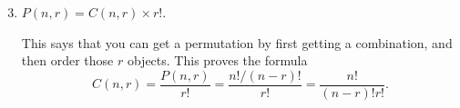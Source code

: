 \begin{frame}
\begin{prop}{}{}
\begin{enumerate} \setcounter{enumi}{2}
\item $P(n,r) = C(n,r) \times r!$. \begin{slide} This says that you can get a permutation by first getting a combination, and then order those $r$ objects. This proves the formula
\[ C(n,r) = \frac{P(n,r)}{r!} = \frac{n!/(n-r)!}{r!} = \frac{n!}{(n-r)!r!}. \] \end{slide}
\end{enumerate}
\end{prop}
\end{frame}

